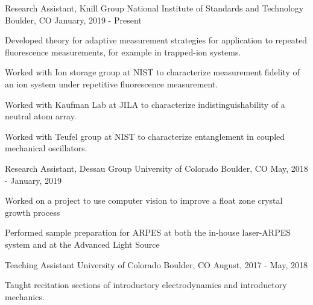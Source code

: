 

\begin{cventries}

  \cventry
    {Research Assistant, Knill Group} %
    {National Institute of Standards and Technology} %
    {Boulder, CO} %
    {January, 2019 - Present} %
    {
      \begin{cvitems} %
        \item {Developed theory for adaptive measurement strategies for
          application to repeated fluorescence measurements, for example in trapped-ion systems.}
        \item {Worked with Ion storage group at NIST to characterize
          measurement fidelity of an ion system under repetitive fluorescence
        measurement.}
        \item {Worked with Kaufman Lab at JILA to characterize
          indistinguishability of a neutral atom array.}
        \item {Worked with Teufel group at NIST to characterize entanglement
          in coupled mechanical oscillators.}
      \end{cvitems}
    }

  \cventry
    {Research Assistant, Dessau Group} %
    {University of Colorado} %
    {Boulder, CO} %
    {May, 2018 - January, 2019} %
    {
      \begin{cvitems} %
        \item {Worked on a project to use computer vision to improve a float
          zone crystal growth process}
        \item {Performed sample preparation for ARPES at both the in-house laser-ARPES system and at the Advanced Light Source}
      \end{cvitems}
    }

  \cventry
    {Teaching Assistant} %
    {University of Colorado} %
    {Boulder, CO} %
    {August, 2017 - May, 2018} %
    {
      \begin{cvitems} %
        \item {Taught recitation sections of introductory electrodynamics and
          introductory mechanics.}
      \end{cvitems}
    }


\end{cventries}

